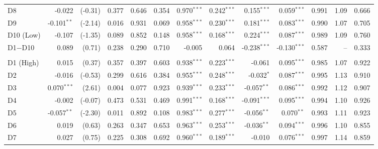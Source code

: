 \begin{table}[!htbp]
{\begin{tabular*}{\linewidth}{@{\extracolsep{\fill}}lrrrrrrrrrrrr}
\hspace{1em}D8 & -0.022 & (-0.31) & 0.377 & 0.646 & 0.354 & 0.970$^{***}$ & 0.242$^{***}$ & 0.155$^{***}$ & 0.059$^{***}$ & 0.991 & 1.09 & 0.666\\
\hspace{1em}D9 & -0.101$^{**}$ & (-2.14) & 0.016 & 0.931 & 0.069 & 0.958$^{***}$ & 0.230$^{***}$ & 0.181$^{***}$ & 0.083$^{***}$ & 0.990 & 1.07 & 0.705\\
\hspace{1em}D10 (Low) & -0.107 & (-1.35) & 0.089 & 0.852 & 0.148 & 0.958$^{***}$ & 0.168$^{***}$ & 0.224$^{***}$ & 0.087$^{***}$ & 0.989 & 1.09 & 0.760\\
\hspace{1em}D1$-$D10 & 0.089 & (0.71) & 0.238 & 0.290 & 0.710 & -0.005 & 0.064 & -0.238$^{***}$ & -0.130$^{***}$ & 0.587 & -- & 0.333\\
\addlinespace[0.3em]
\hline
\multicolumn{13}{l}{\textit{Panel F: Cross-regime (cohorts 3, 4 span a boundary)}}\\
\hspace{1em}D1 (High) & 0.015 & (0.37) & 0.357 & 0.397 & 0.603 & 0.938$^{***}$ & 0.223$^{***}$ & -0.061 & 0.095$^{***}$ & 0.985 & 1.07 & 0.922\\
\hspace{1em}D2 & -0.016 & (-0.53) & 0.299 & 0.616 & 0.384 & 0.955$^{***}$ & 0.248$^{***}$ & -0.032$^{*}$ & 0.087$^{***}$ & 0.995 & 1.13 & 0.910\\
\hspace{1em}D3 & 0.070$^{***}$ & (2.61) & 0.004 & 0.077 & 0.923 & 0.939$^{***}$ & 0.233$^{***}$ & -0.057$^{**}$ & 0.086$^{***}$ & 0.992 & 1.12 & 0.907\\
\hspace{1em}D4 & -0.002 & (-0.07) & 0.473 & 0.531 & 0.469 & 0.991$^{***}$ & 0.168$^{***}$ & -0.091$^{***}$ & 0.095$^{***}$ & 0.994 & 1.10 & 0.926\\
\hspace{1em}D5 & -0.057$^{**}$ & (-2.30) & 0.011 & 0.892 & 0.108 & 0.983$^{***}$ & 0.277$^{***}$ & -0.056$^{**}$ & 0.070$^{**}$ & 0.993 & 1.11 & 0.923\\
\hspace{1em}D6 & 0.019 & (0.63) & 0.263 & 0.347 & 0.653 & 0.963$^{***}$ & 0.253$^{***}$ & -0.036$^{**}$ & 0.094$^{***}$ & 0.996 & 1.10 & 0.855\\
\hspace{1em}D7 & 0.027 & (0.75) & 0.225 & 0.308 & 0.692 & 0.960$^{***}$ & 0.189$^{***}$ & -0.010 & 0.076$^{***}$ & 0.997 & 1.14 & 0.859\\

\end{tabular*}}
\end{table}

